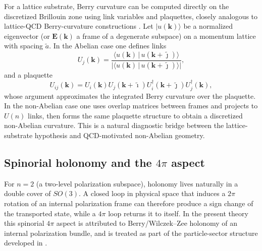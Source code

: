 For a lattice substrate, Berry curvature can be computed directly on the discretized Brillouin zone using
link variables and plaquettes, closely analogous to lattice-QCD Berry-curvature constructions
\citep{Fukui2005ChernDiscretizedBZ,PuYamamoto2018BerryLatticeQCD,Yamamoto2016BerryPhaseLatticeQCD}.
Let $\lvert u(\mathbf{k})\rangle$ be a normalized eigenvector (or $\mathbf{E}(\mathbf{k})$ a frame of a degenerate
subspace) on a momentum lattice with spacing $\tilde a$.
In the Abelian case one defines links
\begin{equation}
  U_j(\mathbf{k})=\frac{\langle u(\mathbf{k})\,|\,u(\mathbf{k}+\tilde{\jmath})\rangle}
  {|\langle u(\mathbf{k})\,|\,u(\mathbf{k}+\tilde{\jmath})\rangle|},
\end{equation}
and a plaquette
\begin{equation}
  U_{ij}(\mathbf{k}) = U_i(\mathbf{k})U_j(\mathbf{k}+\tilde{\imath})
  U_i^\dagger(\mathbf{k}+\tilde{\jmath})U_j^\dagger(\mathbf{k}),
\end{equation}
whose argument approximates the integrated Berry curvature over the plaquette.
In the non-Abelian case one uses overlap matrices between frames and projects to $U(n)$ links, then forms the same
plaquette structure to obtain a discretized non-Abelian curvature.
This is a natural diagnostic bridge between the lattice-substrate hypothesis and QCD-motivated non-Abelian geometry.
\subsection{Spinorial holonomy and the $4\pi$ aspect}

For $n=2$ (a two-level polarization subspace), holonomy lives naturally in a double cover of $SO(3)$.
A closed loop in physical space that induces a $2\pi$ rotation of an internal polarization frame can therefore
produce a sign change of the transported state, while a $4\pi$ loop returns it to itself.
In the present theory this spinorial $4\pi$ aspect is attributed to Berry/Wilczek--Zee holonomy of an internal
polarization bundle, and is treated as part of the particle-sector structure developed in .
